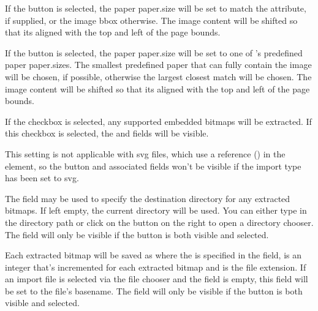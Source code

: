 
If the  button is selected, the paper
\gls{paper.size} will be set to match the 
attribute, if supplied, or the image \gls{bbox} otherwise.
The image content will be shifted so that its aligned with the top
and left of the page bounds.


If the  button is selected, the paper
\gls{paper.size} will be set to one of \FlowframTk's predefined
paper \glspl{paper.size}. The smallest predefined paper that can
fully contain the image will be chosen, if possible, otherwise the
largest closest match will be chosen.
The image content will be shifted so that its aligned with the top
and left of the page bounds.



If the  checkbox is selected,
any supported embedded \glspl{bitmap} will be extracted. If this checkbox
is selected, the  and
 fields will be visible.

This setting is not applicable with \gls{svg} files, which use a
reference () in the  element, so the
 button and associated fields won't
be visible if the import type has been set to \gls{svg}.


The  field may be used to specify the
destination directory for any extracted \glspl{bitmap}. If left
empty, the current directory will be used. You can either type in
the directory path or click on the 
button on the right to open a directory chooser.
The  field will only be visible if the
 button is both visible and selected.


Each extracted \gls{bitmap} will be saved as
 where
the  is specified in the 
field,  is an integer that's incremented for each extracted
\gls{bitmap} and  is the file extension.
If an import file is selected via the file chooser and the
 field is empty, this field will be set to the
file's basename.
The  field will only be visible if the
 button is both visible and selected.

